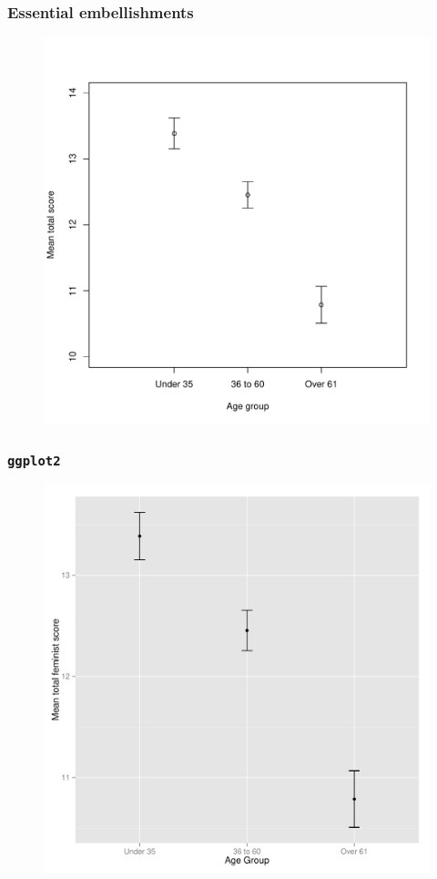 \documentclass{beamer}\usepackage[]{graphicx}\usepackage[]{color}
\begin{document}
\begin{frame}[fragile]
  \frametitle{Essential embellishments}

\begin{figure}[h]
  \vspace{-20pt}
  \centering
  \includegraphics[height = 0.7\textwidth, keepaspectratio]{Figure/m5}
  \label{fig:m5}
\end{figure}
\end{frame} 



\begin{frame}[fragile]
  \frametitle{\texttt{ggplot2}}

\begin{figure}[h]
  \vspace{-20pt}
  \centering
  \includegraphics[height = 0.7\textwidth, keepaspectratio]{Figure/gg}
  \label{fig:gg}
\end{figure}
\end{frame} 
 
\end{document}
